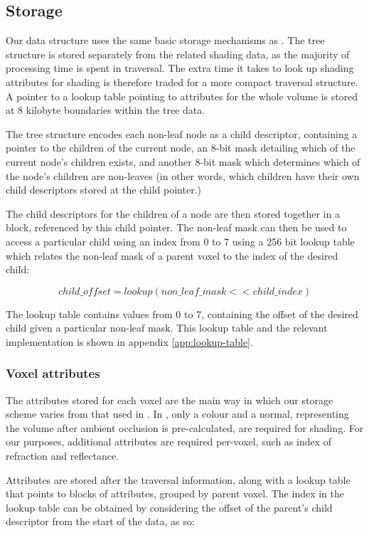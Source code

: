 \subsection{Storage}
Our data structure uses the same basic storage mechanisms as \cite{laine10efficientsvos}. The tree structure is stored separately from the related shading data, as the majority of processing time is spent in traversal. The extra time it takes to look up shading attributes for shading is therefore traded for a more compact traversal structure. A pointer to a lookup table pointing to attributes for the whole volume is stored at 8 kilobyte boundaries within the tree data.

The tree structure encodes each non-leaf node as a child descriptor, containing a pointer to the children of the current node, an 8-bit mask detailing which of the current node's children exists, and another 8-bit mask which determines which of the node's children are non-leaves (in other words, which children have their own child descriptors stored at the child pointer.)

The child descriptors for the children of a node are then stored together in a block, referenced by this child pointer. The non-leaf mask can then be used to access a particular child using an index from 0 to 7 using a 256 bit lookup table which relates the non-leaf mask of a parent voxel to the index of the desired child:

\[
	child\_offset = lookup(non\_leaf\_mask << child\_index)
\]

The lookup table contains values from 0 to 7, containing the offset of the desired child given a particular non-leaf mask. This lookup table and the relevant implementation is shown in appendix \ref{app:lookup-table}.

\subsubsection{Voxel attributes}
The attributes stored for each voxel are the main way in which our storage scheme varies from that used in \cite{laine10efficientsvos}. In \cite{laine10efficientsvos}, only a colour and a normal, representing the volume after ambient occlusion is pre-calculated, are required for shading. For our purposes, additional attributes are required per-voxel, such as index of refraction and reflectance.

Attributes are stored after the traversal information, along with a lookup table that points to blocks of attributes, grouped by parent voxel. The index in the lookup table can be obtained by considering the offset of the parent's child descriptor from the start of the data, as so:

